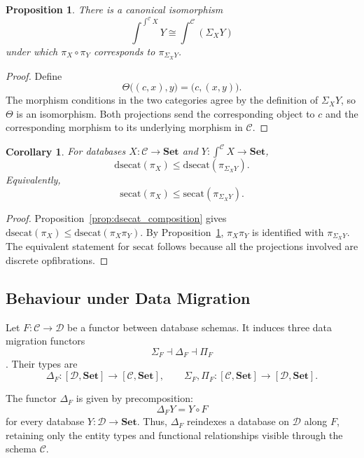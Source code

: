 \documentclass[12pt]{amsart}
\newtheorem{corollary}[teo]{Corollary}
\newtheorem{prop}[teo]{Proposition}
\theoremstyle{definition}
\theoremstyle{remark}
\numberwithin{figure}{section}%
\newcommand{\CC}{\mathcal{C}}
\newcommand{\Dc}{\mathcal{D}}
\newcommand{\Sets}{\mathbf{Set}}
\begin{document}
\begin{prop}\label{prop:iterated_Grothendieck_construction}
There is a canonical isomorphism
\[
\int^{\int^\CC X}Y
\cong
\int^\CC(\Sigma_XY)
\]
under which \(\pi_X\circ\pi_Y\) corresponds to
\(\pi_{\Sigma_XY}\).
\end{prop}

\begin{proof}
Define
\[
\Theta\bigl((c,x),y\bigr)
=
\bigl(c,(x,y)\bigr).
\]
The morphism conditions in the two categories agree by the definition of
\(\Sigma_XY\), so \(\Theta\) is an isomorphism. Both projections send the
corresponding object to \(c\) and the corresponding morphism to its
underlying morphism in \(\CC\).
\end{proof}

\begin{corollary}\label{cor:dsecat_iterated_database}
For databases \(X\colon\CC\to\Sets\) and
\(Y\colon\int^\CC X\to\Sets\),
\[
\mathrm{dsecat}(\pi_X)
\leq
\mathrm{dsecat}(\pi_{\Sigma_XY}).
\]
Equivalently,
\[
\mathrm{secat}(\pi_X)
\leq
\mathrm{secat}(\pi_{\Sigma_XY}).
\]
\end{corollary}

\begin{proof}
Proposition~\ref{prop:dsecat_composition} gives
\(\mathrm{dsecat}(\pi_X)\leq
\mathrm{dsecat}(\pi_X\pi_Y)\).
By Proposition~\ref{prop:iterated_Grothendieck_construction},
\(\pi_X\pi_Y\) is identified with \(\pi_{\Sigma_XY}\).
The equivalent statement for \(\mathrm{secat}\) follows because all the
projections involved are discrete opfibrations.
\end{proof}


\subsection{Behaviour under Data Migration}
\label{subsec:data_migration}

Let \(F\colon\CC\to\Dc\) be a functor between database schemas. It induces
three data migration functors
\[
\Sigma_F
\dashv
\Delta_F
\dashv
\Pi_F
\]
\cite{SpivakDataMigration}. Their types are
\[
\Delta_F\colon[\Dc,\Sets]\longrightarrow[\CC,\Sets],
\qquad
\Sigma_F,\Pi_F\colon[\CC,\Sets]\longrightarrow[\Dc,\Sets].
\]

The functor \(\Delta_F\) is given by precomposition:
\[
\Delta_FY=Y\circ F
\]
for every database \(Y\colon\Dc\to\Sets\). Thus, \(\Delta_F\) reindexes a
database on \(\Dc\) along \(F\), retaining only the entity types and
functional relationships visible through the schema \(\CC\).
\end{document}

